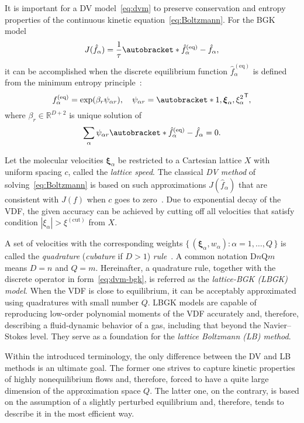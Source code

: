 \documentclass{article}
\newcommand{\Set}[2]{\{\,{#1}:{#2}\,\}}
\newcommand{\transpose}[1]{#1^\mathsf{T}}
\DeclarePairedDelimiter\autobracket()       %
\newcommand{\br}[1]{\autobracket*{#1}}
\newcommand{\bxi}{{\boldsymbol{\xi}}}
\newcommand{\bxia}{\bxi_\alpha}
\newcommand{\equil}[1]{#1^\mathrm{(eq)}}
\begin{document}
It is important for a DV model~\eqref{eq:dvm} to preserve conservation and entropy properties
of the continuous kinetic equation~\eqref{eq:Boltzmann}.
For the BGK model
\begin{equation}\label{eq:dvm-bgk}
    J(\hat{f}_\alpha) = \frac1\tau\br{\equil{\hat{f}}_\alpha-\hat{f}_\alpha},
\end{equation}
it can be accomplished when the discrete equilibrium function \(\equil{\hat{f}}_\alpha\)
is defined from the minimum entropy principle~\cite{Mieussens2000}:
\begin{equation}\label{eq:equilibrium-bgk}
    \equil{f}_\alpha = \exp(\beta_r\psi_{\alpha r}), \quad
    \psi_{\alpha r} = \transpose{\br{1,\bxia, \xi_\alpha^2}},
\end{equation}
where \(\beta_r\in\mathbb{R}^{D+2}\) is unique solution of
\begin{equation}\label{eq:beta}
    \sum_\alpha\psi_{\alpha r}\br{\equil{\hat{f}}_\alpha - \hat{f}_\alpha} = 0.
\end{equation}

Let the molecular velocities \(\bxia\) be restricted to a Cartesian lattice \(X\)
with uniform spacing \(c\), called the \emph{lattice speed}.
The classical \emph{DV method} of solving~\eqref{eq:Boltzmann} is based on such approximations \(J(\hat{f}_\alpha)\)
that are consistent with \(J(f)\) when \(c\) goes to zero~\cite{Aristov2001}.
Due to exponential decay of the VDF, the given accuracy can be achieved
by cutting off all velocities that satisfy condition \(|\xi_\alpha| > \xi^{(\mathrm{cut})}\) from \(X\).

A set of velocities with the corresponding weights \(\Set{(\bxia,w_\alpha)}{\alpha=1,\dots,Q}\)
is called the \emph{quadrature} (\emph{cubature} if \(D>1\)) \emph{rule}~\cite{Stroud1971}.
A common notation D\(n\)Q\(m\) means \(D=n\) and \(Q=m\).
Hereinafter, a quadrature rule, together with the discrete operator in form~\eqref{eq:dvm-bgk},
is referred as the \emph{lattice-BGK (LBGK) model}.
When the VDF is close to equilibrium, it can be acceptably approximated using quadratures with small number \(Q\).
LBGK models are capable of reproducing low-order polynomial moments of the VDF accurately and,
therefore, describing a fluid-dynamic behavior of a gas, including that beyond the Navier--Stokes level.
They serve as a foundation for the \emph{lattice Boltzmann (LB) method}.

Within the introduced terminology, the only difference between the DV and LB methods is an ultimate goal.
The former one strives to capture kinetic properties of highly nonequilibrium flows and, therefore,
forced to have a quite large dimension of the approximation space \(Q\).
The latter one, on the contrary, is based on the assumption of a slightly perturbed equilibrium and, therefore,
tends to describe it in the most efficient way.
\end{document}
